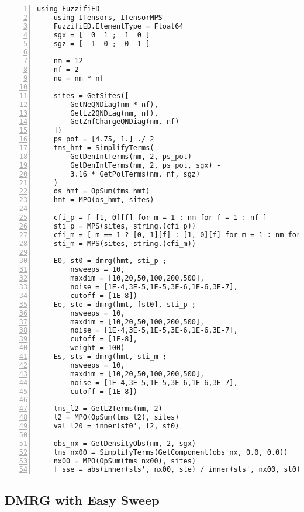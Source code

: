 \documentclass{timesjhep}
\begin{document}
\begin{lstlisting}[numbers=left]
    using FuzzifiED
    using ITensors, ITensorMPS
    FuzzifiED.ElementType = Float64
    sgx = [  0  1 ;  1  0 ]
    sgz = [  1  0 ;  0 -1 ]

    nm = 12
    nf = 2
    no = nm * nf

    sites = GetSites([
        GetNeQNDiag(nm * nf), 
        GetLz2QNDiag(nm, nf),
        GetZnfChargeQNDiag(nm, nf)
    ])
    ps_pot = [4.75, 1.] ./ 2
    tms_hmt = SimplifyTerms(
        GetDenIntTerms(nm, 2, ps_pot) - 
        GetDenIntTerms(nm, 2, ps_pot, sgx) - 
        3.16 * GetPolTerms(nm, nf, sgz)
    )
    os_hmt = OpSum(tms_hmt)
    hmt = MPO(os_hmt, sites)

    cfi_p = [ [1, 0][f] for m = 1 : nm for f = 1 : nf ]
    sti_p = MPS(sites, string.(cfi_p))
    cfi_m = [ m == 1 ? [0, 1][f] : [1, 0][f] for m = 1 : nm for f = 1 : nf ]
    sti_m = MPS(sites, string.(cfi_m))

    E0, st0 = dmrg(hmt, sti_p ; 
        nsweeps = 10, 
        maxdim = [10,20,50,100,200,500], 
        noise = [1E-4,3E-5,1E-5,3E-6,1E-6,3E-7], 
        cutoff = [1E-8])
    Ee, ste = dmrg(hmt, [st0], sti_p ; 
        nsweeps = 10, 
        maxdim = [10,20,50,100,200,500], 
        noise = [1E-4,3E-5,1E-5,3E-6,1E-6,3E-7], 
        cutoff = [1E-8], 
        weight = 100)
    Es, sts = dmrg(hmt, sti_m ; 
        nsweeps = 10, 
        maxdim = [10,20,50,100,200,500], 
        noise = [1E-4,3E-5,1E-5,3E-6,1E-6,3E-7], 
        cutoff = [1E-8])
    
    tms_l2 = GetL2Terms(nm, 2)
    l2 = MPO(OpSum(tms_l2), sites)
    val_l20 = inner(st0', l2, st0)
    
    obs_nx = GetDensityObs(nm, 2, sgx)
    tms_nx00 = SimplifyTerms(GetComponent(obs_nx, 0.0, 0.0))
    nx00 = MPO(OpSum(tms_nx00), sites)
    f_sse = abs(inner(sts', nx00, ste) / inner(sts', nx00, st0))
\end{lstlisting}

\subsection{DMRG with Easy Sweep}
\end{document}
